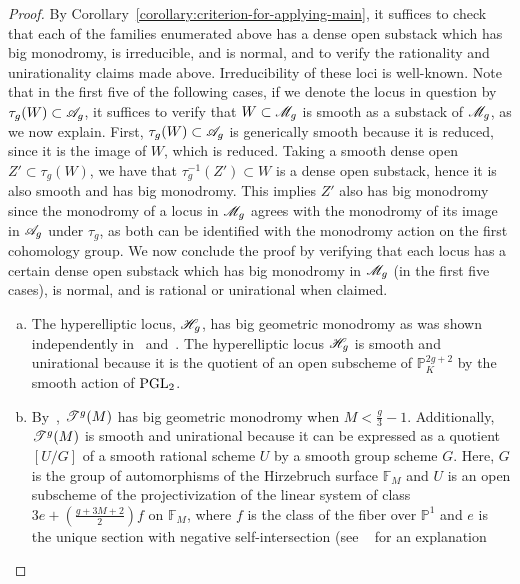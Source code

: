 \begin{proof}
By Corollary~\ref{corollary:criterion-for-applying-main}, it suffices to check that each of the families enumerated above has a dense open substack which has big monodromy, is irreducible, and is normal, and to verify the rationality and unirationality claims made above.
Irreducibility of these loci is well-known.
Note that in the first five of the following cases, if we denote the locus in question by $\tau_g(W) \subset {\mathscr A_g}$, it suffices to verify that $W \subset {\mathscr M_g}$ is smooth as a substack of ${\mathscr M_g}$, as we now explain.
First, $\tau_g(W) \subset {\mathscr A_g}$ is generically smooth because it is reduced, since it is the image of $W$, which is reduced.
Taking a smooth dense open $Z' \subset \tau_g(W)$, we have that $\tau_g^{-1}(Z') \subset W$ is a dense open substack, hence it is also
smooth and has big monodromy. This implies $Z'$ also has big monodromy since the monodromy of a locus in ${\mathscr M_g}$ agrees with the monodromy of its image in ${\mathscr A_g}$ under $\tau_g$, as both can be identified with the monodromy action on
the first cohomology group.
We now conclude the proof by verifying that each locus has a certain dense open substack which has big monodromy in ${\mathscr M_g}$ (in the first five cases), is normal, and is rational or unirational when claimed.
\begin{enumerate}[(a)]
              \item The hyperelliptic locus, $\mathscr H_{g}$, has big geometric monodromy as was shown independently in~\cite[Lemma 8.12]{mumford:tata-lectures-on-theta-ii} and~\cite[Th\'eor\`eme 1]{acampo:tresses-monodromie-et-le-groupe-symplectique}.
	       The hyperelliptic locus $\mathscr H_{g}$ is smooth and unirational because it is the quotient of an open subscheme of
	       $\mathbb P^{2g+2}_K$ by the smooth action of $\operatorname{PGL}_2$.
\item By~\cite[Theorem, p.~2]{bolognesi2016mapping}, $\mathscr T^{g} (M)$ has big geometric monodromy when $M < \frac{g}{3}-1$.
	      Additionally, $\mathscr T^{g}(M)$ is smooth and unirational because it can be expressed as a quotient
	      $[U/G]$ of a smooth rational scheme $U$ by a smooth group scheme $G$.
	      Here, $G$ is the group of automorphisms of the Hirzebruch surface $\mathbb F_M$
	      and $U$ is an open subscheme of the projectivization of the linear system of class $3e + \left(\frac{g + 3M + 2}{2}\right) f$ on $\mathbb F_M$, where $f$ is the class of the fiber over $\mathbb P^1$ and $e$
	      is the unique section with negative self-intersection (see ~\cite[p.~8]{bolognesi2016mapping} for an explanation

\end{enumerate}
\end{proof}
